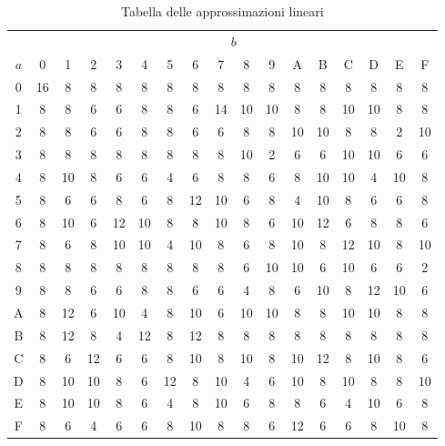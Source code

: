 \begin{table}[h]
\centering
\begin{tabular}{|c|*{16}{c}|}
\hline
 & \multicolumn{16}{c|}{$b$} \\
$a$ 
& 0 & 1 & 2 & 3 & 4 & 5 & 6 & 7 & 8 & 9 & A & B & C & D & E & F \\
\hline
0 & 16 & 8 & 8 & 8 & 8 & 8 & 8 & 8 & 8 & 8 & 8 & 8 & 8 & 8 & 8 & 8 \\
1 & 8 & 8 & 6 & 6 & 8 & 8 & 6 & 14 & 10 & 10 & 8 & 8 & 10 & 10 & 8 & 8 \\
2 & 8 & 8 & 6 & 6 & 8 & 8 & 6 & 6 & 8 & 8 & 10 & 10 & 8 & 8 & 2 & 10 \\
3 & 8 & 8 & 8 & 8 & 8 & 8 & 8 & 8 & 10 & 2 & 6 & 6 & 10 & 10 & 6 & 6 \\
4 & 8 & 10 & 8 & 6 & 6 & 4 & 6 & 8 & 8 & 6 & 8 & 10 & 10 & 4 & 10 & 8 \\
5 & 8 & 6 & 6 & 8 & 6 & 8 & 12 & 10 & 6 & 8 & 4 & 10 & 8 & 6 & 6 & 8 \\
6 & 8 & 10 & 6 & 12 & 10 & 8 & 8 & 10 & 8 & 6 & 10 & 12 & 6 & 8 & 8 & 6 \\
7 & 8 & 6 & 8 & 10 & 10 & 4 & 10 & 8 & 6 & 8 & 10 & 8 & 12 & 10 & 8 & 10 \\
8 & 8 & 8 & 8 & 8 & 8 & 8 & 8 & 8 & 6 & 10 & 10 & 6 & 10 & 6 & 6 & 2 \\
9 & 8 & 8 & 6 & 6 & 8 & 8 & 6 & 6 & 4 & 8 & 6 & 10 & 8 & 12 & 10 & 6 \\
A & 8 & 12 & 6 & 10 & 4 & 8 & 10 & 6 & 10 & 10 & 8 & 8 & 10 & 10 & 8 & 8 \\
B & 8 & 12 & 8 & 4 & 12 & 8 & 12 & 8 & 8 & 8 & 8 & 8 & 8 & 8 & 8 & 8 \\
C & 8 & 6 & 12 & 6 & 6 & 8 & 10 & 8 & 10 & 8 & 10 & 12 & 8 & 10 & 8 & 6 \\
D & 8 & 10 & 10 & 8 & 6 & 12 & 8 & 10 & 4 & 6 & 10 & 8 & 10 & 8 & 8 & 10 \\
E & 8 & 10 & 10 & 8 & 6 & 4 & 8 & 10 & 6 & 8 & 8 & 6 & 4 & 10 & 6 & 8 \\
F & 8 & 6 & 4 & 6 & 6 & 8 & 10 & 8 & 8 & 6 & 12 & 6 & 6 & 8 & 10 & 8 \\
\hline
\end{tabular}
\caption{Tabella delle approssimazioni lineari}
\label{tab:NL}
\end{table}
